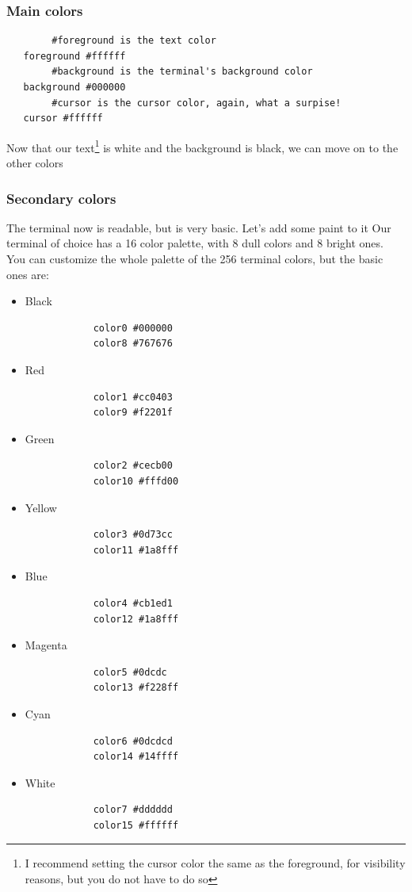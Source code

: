 \subsubsection{Main colors}
\begin{lstlisting}
        #foreground is the text color
   foreground #ffffff 
        #background is the terminal's background color
   background #000000
        #cursor is the cursor color, again, what a surpise!
   cursor #ffffff
\end{lstlisting}
Now that our text\footnote{I recommend setting the cursor color the same as the foreground, for visibility reasons, but you do not have to do so} is white and the background is black, we can move on to the other colors

\subsubsection{Secondary colors}
The terminal now is readable, but is very basic. Let's add some paint to it
Our terminal of choice has a 16 color palette, with 8 dull colors and 8 bright ones. You can customize the whole palette of the 256 terminal colors, but the basic ones are:
\begin{itemize}
    \item Black
        \begin{lstlisting}
            color0 #000000
            color8 #767676
        \end{lstlisting}
    \item Red
        \begin{lstlisting}
            color1 #cc0403
            color9 #f2201f
        \end{lstlisting}
    \item Green
        \begin{lstlisting}
            color2 #cecb00
            color10 #fffd00
        \end{lstlisting}
    \item Yellow
        \begin{lstlisting}
            color3 #0d73cc
            color11 #1a8fff
        \end{lstlisting}
\pagebreak
    \item Blue
        \begin{lstlisting}
            color4 #cb1ed1
            color12 #1a8fff
        \end{lstlisting}
    \item Magenta
        \begin{lstlisting}
            color5 #0dcdc
            color13 #f228ff
        \end{lstlisting}
    \item Cyan
        \begin{lstlisting}
            color6 #0dcdcd
            color14 #14ffff
        \end{lstlisting}
    \item White
        \begin{lstlisting}
            color7 #dddddd
            color15 #ffffff
        \end{lstlisting}
\end{itemize}

